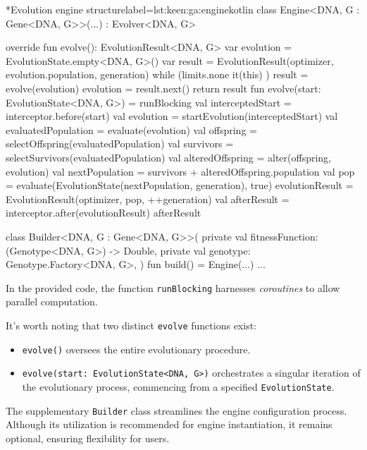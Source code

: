   \begin{code}*{Evolution engine structure}{label={lst:keen:ga:engine}}{kotlin}
    class Engine<DNA, G : Gene<DNA, G>>(...) : Evolver<DNA, G> {
        override fun evolve(): EvolutionResult<DNA, G> {
            var evolution = EvolutionState.empty<DNA, G>()
            var result = EvolutionResult(optimizer, evolution.population, generation)
            while (limits.none { it(this) }) {
                result = evolve(evolution)
                evolution = result.next()
            }
            return result
        }
        fun evolve(start: EvolutionState<DNA, G>) = runBlocking {
            val interceptedStart = interceptor.before(start)
            val evolution = startEvolution(interceptedStart)
            val evaluatedPopulation = evaluate(evolution)
            val offspring = selectOffspring(evaluatedPopulation)
            val survivors = selectSurvivors(evaluatedPopulation)
            val alteredOffspring = alter(offspring, evolution)
            val nextPopulation = survivors + alteredOffspring.population
            val pop = evaluate(EvolutionState(nextPopulation, generation), true)
            evolutionResult = EvolutionResult(optimizer, pop, ++generation)
            val afterResult = interceptor.after(evolutionResult)
            afterResult
        }

        class Builder<DNA, G : Gene<DNA, G>>(
            private val fitnessFunction: (Genotype<DNA, G>) -> Double,
            private val genotype: Genotype.Factory<DNA, G>,
        ) {
            fun build() = Engine(...)
            ...
        }
    }
  \end{code}

  In the provided code, the function \texttt{runBlocking} harnesses 
  \textit{coroutines} to allow parallel computation.

  It's worth noting that two distinct \texttt{evolve} functions exist: 
  
  \begin{itemize}
    \item \texttt{evolve()} oversees the entire evolutionary procedure.
    \item \texttt{evolve(start: EvolutionState<DNA, G>)} orchestrates a singular
      iteration of the evolutionary process, commencing from a specified
      \texttt{EvolutionState}.
  \end{itemize}

  The supplementary \texttt{Builder} class streamlines the engine configuration 
  process.
  Although its utilization is recommended for engine instantiation, it remains 
  optional, ensuring flexibility for users.

